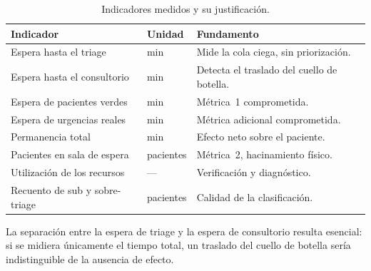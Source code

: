 \begin{table}[H]
\centering
\small
\begin{tabular}{llp{6.2cm}}
\toprule
\textbf{Indicador} & \textbf{Unidad} & \textbf{Fundamento} \\
\midrule
Espera hasta el triage & min & Mide la cola ciega, sin priorización. \\
Espera hasta el consultorio & min & Detecta el traslado del cuello de botella. \\
Espera de pacientes verdes & min & Métrica~1 comprometida. \\
Espera de urgencias reales & min & Métrica adicional comprometida. \\
Permanencia total & min & Efecto neto sobre el paciente. \\
Pacientes en sala de espera & pacientes & Métrica~2, hacinamiento físico. \\
Utilización de los recursos & --- & Verificación y diagnóstico. \\
Recuento de sub y sobre-triage & pacientes & Calidad de la clasificación. \\
\bottomrule
\end{tabular}
\caption{Indicadores medidos y su justificación.}
\end{table}

La separación entre la espera de triage y la espera de consultorio resulta
esencial: si se midiera únicamente el tiempo total, un traslado del cuello de
botella sería indistinguible de la ausencia de efecto.

